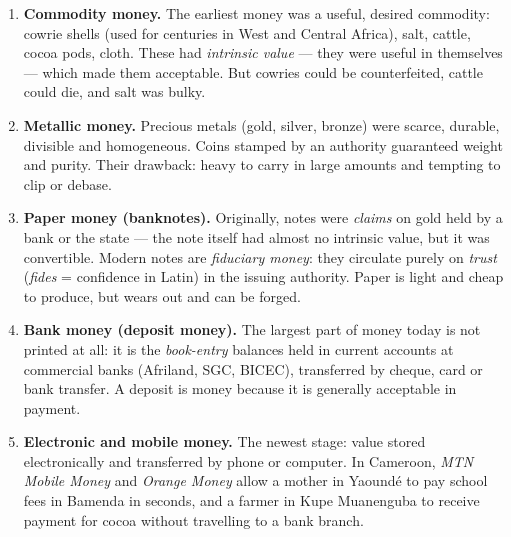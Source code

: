 \documentclass[11pt]{article}
\begin{document}
\begin{enumerate}
\item \textbf{Commodity money.} The earliest money was a useful, desired commodity: cowrie shells (used for centuries in West and Central Africa), salt, cattle, cocoa pods, cloth. These had \emph{intrinsic value} --- they were useful in themselves --- which made them acceptable. But cowries could be counterfeited, cattle could die, and salt was bulky.
\item \textbf{Metallic money.} Precious metals (gold, silver, bronze) were scarce, durable, divisible and homogeneous. Coins stamped by an authority guaranteed weight and purity. Their drawback: heavy to carry in large amounts and tempting to clip or debase.
\item \textbf{Paper money (banknotes).} Originally, notes were \emph{claims} on gold held by a bank or the state --- the note itself had almost no intrinsic value, but it was convertible. Modern notes are \emph{fiduciary money}: they circulate purely on \emph{trust} (\emph{fides} = confidence in Latin) in the issuing authority. Paper is light and cheap to produce, but wears out and can be forged.
\item \textbf{Bank money (deposit money).} The largest part of money today is not printed at all: it is the \emph{book-entry} balances held in current accounts at commercial banks (Afriland, SGC, BICEC), transferred by cheque, card or bank transfer. A deposit is money because it is generally acceptable in payment.
\item \textbf{Electronic and mobile money.} The newest stage: value stored electronically and transferred by phone or computer. In Cameroon, \emph{MTN Mobile Money} and \emph{Orange Money} allow a mother in Yaoundé to pay school fees in Bamenda in seconds, and a farmer in Kupe Muanenguba to receive payment for cocoa without travelling to a bank branch.
\end{enumerate}
\end{document}
